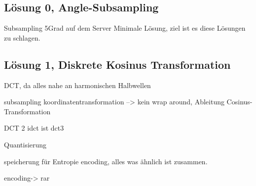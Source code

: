 \subsection{Lösung 0, Angle-Subsampling}
Subsampling 5Grad auf dem Server
Minimale Lösung, ziel ist es diese Lösungen zu schlagen.

\subsection{Lösung 1, Diskrete Kosinus Transformation}
DCT, da alles nahe an harmonischen Halbwellen

subsampling
koordinatentransformation --> kein wrap around,
Ableitung
Cosinus-Transformation

DCT 2
idct ist dct3

Quantisierung

speicherung für Entropie encoding, alles was ähnlich ist zusammen.

encoding-> rar




